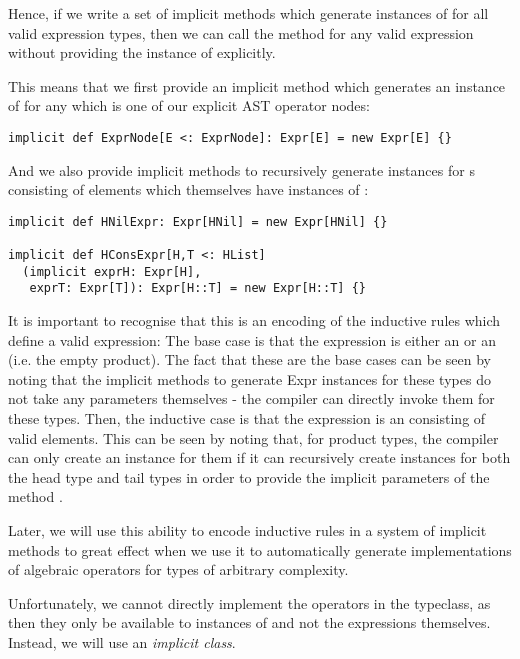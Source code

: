 Hence, if we write a set of implicit methods which generate instances of  for all valid expression types, then we can call the method  for any valid expression without providing the instance of  explicitly.

This means that we first provide an implicit method which generates an instance of  for any  which is one of our explicit AST operator nodes:
\vs\begin{lstlisting}
implicit def ExprNode[E <: ExprNode]: Expr[E] = new Expr[E] {}
\end{lstlisting} \vs
And we also provide implicit methods to recursively generate instances for s consisting of elements which themselves have instances of :
\vs\begin{lstlisting}
implicit def HNilExpr: Expr[HNil] = new Expr[HNil] {}

implicit def HConsExpr[H,T <: HList]
  (implicit exprH: Expr[H],
   exprT: Expr[T]): Expr[H::T] = new Expr[H::T] {}
\end{lstlisting}\vs
It is important to recognise that this is an encoding of the inductive rules which define a valid expression: The base case is that the expression is either an  or an  (i.e. the empty product). The fact that these are the base cases can be seen by noting that the implicit methods to generate Expr instances for these types do not take any parameters themselves - the compiler can directly invoke them for these types. Then, the inductive case is that the expression is an  consisting of valid  elements. This can be seen by noting that, for product types, the compiler can only create an  instance for them if it can recursively create  instances for both the head type and tail types in order to provide the implicit parameters of the method .

Later, we will use this ability to encode inductive rules in a system of implicit methods to great effect when we use it to automatically generate implementations of algebraic operators for types of arbitrary complexity.

\vs Unfortunately, we cannot directly implement the operators in the  typeclass, as then they only be available to instances of  and not the expressions themselves. Instead, we will use an \textit{implicit class}.

